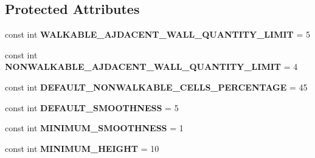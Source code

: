 \subsection*{Protected Attributes}
\begin{DoxyCompactItemize}
\item 
\hypertarget{class_hel_project_1_1_game_world_1_1_map_1_1_h_map_afdb3f4541f41bf3298a65d83fe342fd3}{}const int {\bfseries W\+A\+L\+K\+A\+B\+L\+E\+\_\+\+A\+J\+D\+A\+C\+E\+N\+T\+\_\+\+W\+A\+L\+L\+\_\+\+Q\+U\+A\+N\+T\+I\+T\+Y\+\_\+\+L\+I\+M\+I\+T} = 5\label{class_hel_project_1_1_game_world_1_1_map_1_1_h_map_afdb3f4541f41bf3298a65d83fe342fd3}

\item 
\hypertarget{class_hel_project_1_1_game_world_1_1_map_1_1_h_map_adec137c67915041b0385fe5210374aaf}{}const int {\bfseries N\+O\+N\+W\+A\+L\+K\+A\+B\+L\+E\+\_\+\+A\+J\+D\+A\+C\+E\+N\+T\+\_\+\+W\+A\+L\+L\+\_\+\+Q\+U\+A\+N\+T\+I\+T\+Y\+\_\+\+L\+I\+M\+I\+T} = 4\label{class_hel_project_1_1_game_world_1_1_map_1_1_h_map_adec137c67915041b0385fe5210374aaf}

\item 
\hypertarget{class_hel_project_1_1_game_world_1_1_map_1_1_h_map_aec706cf1ce8a5b616668a38724ad166d}{}const int {\bfseries D\+E\+F\+A\+U\+L\+T\+\_\+\+N\+O\+N\+W\+A\+L\+K\+A\+B\+L\+E\+\_\+\+C\+E\+L\+L\+S\+\_\+\+P\+E\+R\+C\+E\+N\+T\+A\+G\+E} = 45\label{class_hel_project_1_1_game_world_1_1_map_1_1_h_map_aec706cf1ce8a5b616668a38724ad166d}

\item 
\hypertarget{class_hel_project_1_1_game_world_1_1_map_1_1_h_map_a7b858f0141cc097a7f203ff31e7e8d12}{}const int {\bfseries D\+E\+F\+A\+U\+L\+T\+\_\+\+S\+M\+O\+O\+T\+H\+N\+E\+S\+S} = 5\label{class_hel_project_1_1_game_world_1_1_map_1_1_h_map_a7b858f0141cc097a7f203ff31e7e8d12}

\item 
\hypertarget{class_hel_project_1_1_game_world_1_1_map_1_1_h_map_a7f56c08e74260ac98bbb8dcaf27366b0}{}const int {\bfseries M\+I\+N\+I\+M\+U\+M\+\_\+\+S\+M\+O\+O\+T\+H\+N\+E\+S\+S} = 1\label{class_hel_project_1_1_game_world_1_1_map_1_1_h_map_a7f56c08e74260ac98bbb8dcaf27366b0}

\item 
\hypertarget{class_hel_project_1_1_game_world_1_1_map_1_1_h_map_ae7a4cf767cfd48b81c2066ec99c0bb83}{}const int {\bfseries M\+I\+N\+I\+M\+U\+M\+\_\+\+H\+E\+I\+G\+H\+T} = 10\label{class_hel_project_1_1_game_world_1_1_map_1_1_h_map_ae7a4cf767cfd48b81c2066ec99c0bb83}


\end{DoxyCompactItemize}
